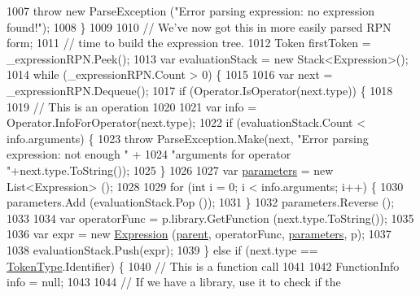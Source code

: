 \begin{DoxyCode}
1007                     \textcolor{keywordflow}{throw} \textcolor{keyword}{new} ParseException (\textcolor{stringliteral}{"Error parsing expression: no expression found!"});
1008                 \}
1009 
1010                 \textcolor{comment}{// We've now got this in more easily parsed RPN form; }
1011                 \textcolor{comment}{// time to build the expression tree.}
1012                 Token firstToken = \_expressionRPN.Peek();
1013                 var evaluationStack = \textcolor{keyword}{new} Stack<Expression>();
1014                 \textcolor{keywordflow}{while} (\_expressionRPN.Count > 0) \{
1015 
1016                     var next = \_expressionRPN.Dequeue();
1017                     \textcolor{keywordflow}{if} (Operator.IsOperator(next.type)) \{
1018 
1019                         \textcolor{comment}{// This is an operation}
1020 
1021                         var info = Operator.InfoForOperator(next.type);
1022                         \textcolor{keywordflow}{if} (evaluationStack.Count < info.arguments) \{
1023                             \textcolor{keywordflow}{throw} ParseException.Make(next, \textcolor{stringliteral}{"Error parsing expression: not enough "} +
1024                                 \textcolor{stringliteral}{"arguments for operator "}+next.type.ToString());
1025                         \}
1026 
1027                         var \hyperlink{a00080_a7b21380bead8ae08b2cfc6594edab32c}{parameters} = \textcolor{keyword}{new} List<Expression> ();
1028 
1029                         \textcolor{keywordflow}{for} (\textcolor{keywordtype}{int} i = 0; i < info.arguments; i++) \{
1030                             parameters.Add (evaluationStack.Pop ());
1031                         \}
1032                         parameters.Reverse ();
1033 
1034                         var operatorFunc = p.library.GetFunction (next.type.ToString());
1035 
1036                         var expr = \textcolor{keyword}{new} \hyperlink{a00080_a17e5101d02b96d0071e7a0223e4daa3d}{Expression} (\hyperlink{a00120_af313a82103fcc2ff5a177dbb06b92f7b}{parent}, operatorFunc, 
      \hyperlink{a00080_a7b21380bead8ae08b2cfc6594edab32c}{parameters}, p);
1037 
1038                         evaluationStack.Push(expr);
1039                     \} \textcolor{keywordflow}{else} \textcolor{keywordflow}{if} (next.type == \hyperlink{a00029_a301aa7c866593a5b625a8fc158bbeace}{TokenType}.Identifier) \{
1040                         \textcolor{comment}{// This is a function call}
1041 
1042                         FunctionInfo info = null;
1043 
1044                         \textcolor{comment}{// If we have a library, use it to check if the}

\end{DoxyCode}
